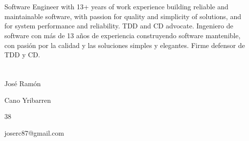\maketitle

\section{\ml{}{}} 

{\ml
{
Software Engineer with 13+ years of work experience building reliable and
maintainable software, with passion for quality and simplicity of solutions,
and for system performance and reliability. TDD and CD advocate.
}
{
Ingeniero de software con más de 13 años de experiencia construyendo software
mantenible, con pasión por la calidad y las soluciones simples y elegantes.
Firme defensor de TDD y CD.
}
}

\section{} 

\cvitem
    {}
    {José Ramón}

\cvitem
    {}
    {Cano Yribarren}

\cvitem
    {}
    {}

\cvitem
    {}
    {}

\cvitem
    {}
    {38}

\cvitem
    {}
    {joserc87@gmail.com}
